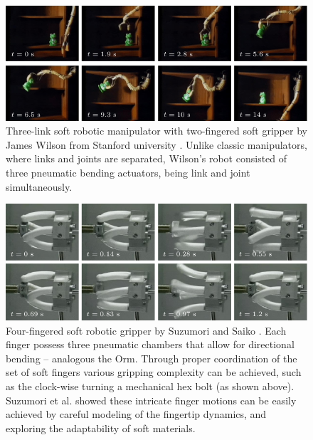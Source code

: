 \begin{figure}[!t]
  \vspace{-2mm}
  \centering
  \includegraphics*[width=\textwidth]{./pdf/thesis-figure-2-6.pdf}
  \caption{Three-link soft robotic manipulator with two-fingered soft gripper by James Wilson from Stanford university \cite{Wilson2007}. Unlike classic manipulators, where links and joints are separated, Wilson's robot consisted of three pneumatic bending actuators, being link and joint simultaneously.
  \label{fig:C0:fist_srm_robot}}
\end{figure}

\begin{figure}[!t]
  \vspace{-2mm}
  \includegraphics*[width=\textwidth]{./pdf/thesis-figure-2-7.pdf}
  \caption{Four-fingered soft robotic gripper by Suzumori and Saiko \cite{Suzumori1991,Suzumori1992}. Each finger possess three pneumatic chambers that allow for directional bending -- analogous the Orm. Through proper coordination of the set of soft fingers various gripping complexity can be achieved, such as the clock-wise turning a mechanical hex bolt (as shown above). Suzumori et al. showed these intricate finger motions can be easily achieved by careful modeling of the fingertip dynamics, and exploring the adaptability of soft materials.
  \label{fig:C0:fist_grip_robot}}
  \vspace{-3mm}
  
\end{figure}

